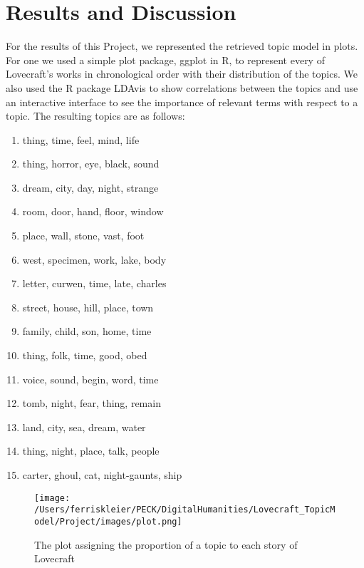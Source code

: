\section{Results and Discussion}

For the results of this Project, we represented the retrieved topic model in plots. For one we 
used a simple plot package, ggplot in R, to represent every of Lovecraft’s works in chronological 
order with their distribution of the topics. We also used the R package LDAvis to show correlations 
between the topics and use an interactive interface to see the importance of relevant terms with 
respect to a topic. The resulting topics are as follows:

\begin{enumerate}
    \itemsep0em
    \item thing, time, feel, mind, life
    \item thing, horror, eye, black, sound
    \item dream, city, day, night, strange
    \item room, door, hand, floor, window
    \item place, wall, stone, vast, foot
    \item west, specimen, work, lake, body
    \item letter, curwen, time, late, charles
    \item street, house, hill, place, town
    \item family, child, son, home, time
    \item thing, folk, time, good, obed
    \item voice, sound, begin, word, time
    \item tomb, night, fear, thing, remain
    \item land, city, sea, dream, water
    \item thing, night, place, talk, people
    \item carter, ghoul, cat, night-gaunts, ship
\end{enumerate}

\begin{figure}[ht]
    \centering
    \texttt{[image: /Users/ferriskleier/PECK/DigitalHumanities/Lovecraft\_TopicModel/Project/images/plot.png]}
    \caption{The plot assigning the proportion of a topic to each story of Lovecraft}
    \label{fig:mesh1}
\end{figure}

